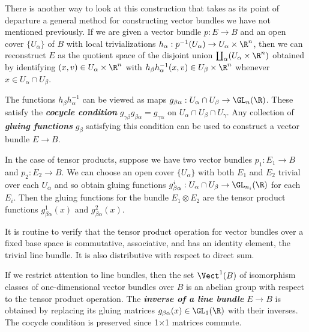 \begin{remark}
	There is another way to look at this construction that takes as its point of departure a general method for constructing vector bundles we have not mentioned previously. If we are given a vector bundle $p:E\to B$ and an open cover $\{U_\alpha\}$ of $B$ with local trivializations $h_\alpha:p^{-1}(U_\alpha)\to U_\alpha\times\R^n$, then we can reconstruct $E$ as the quotient space of the disjoint union $\coprod_\alpha(U_\alpha\times\R^n)$ obtained by identifying $(x,v)\in U_\alpha\times\R^n$ with $h_\beta h_\alpha^{-1}(x,v)\in U_\beta\times\R^n$ whenever $x\in U_\alpha\cap U_\beta$.
	
	The functions $h_\beta h_\alpha^{-1}$ can be viewed as maps $g_{\beta\alpha}:U_\alpha\cap U_\beta\to \GL_n(\R)$. These satisfy the \textbf{\textit{cocycle condition}}\label{cocycle-condition} $g_{\gamma\beta}g_{\beta\alpha}=g_{\gamma\alpha}$ on $U_\alpha\cap U_\beta\cap U_\gamma$. Any collection of \textbf{\textit{gluing functions}} $g_{\beta}$ satisfying this condition can be used to construct a vector bundle $E\to B$.
	
	In the case of tensor products, suppose we have two vector bundles $p_1:E_1\to B$ and $p_2:E_2\to B$. We can choose an open cover $\{U_\alpha\}$ with both $E_1$ and $E_2$ trivial over each $U_\alpha$ and so obtain gluing functions $g_{\beta\alpha}^i:U_\alpha\cap U_\beta\to\GL_{n_i}(\R)$ for each $E_i$. Then the gluing functions for the bundle $E_1\otimes E_2$ are the tensor product functions $g_{\beta\alpha}^1(x)$ and $g_{\beta\alpha}^2(x)$.
\end{remark}
\begin{prop}
	It is routine to verify that the tensor product operation for vector bundles over a fixed base space is commutative, associative, and has an identity element, the trivial line bundle. It is also distributive with respect to direct sum.
\end{prop}
\begin{defn}
	If we restrict attention to line bundles, then the set $\Vect^1(B)$ of isomorphism classes of one-dimensional vector bundles over $B$ is an abelian group with respect to the tensor product operation. The \textbf{\textit{inverse of a line bundle}} $E\to B$ is obtained by replacing its gluing matrices $g_{\beta\alpha}(x)\in\GL_1(\R)$ with their inverses. The cocycle condition is preserved since 1×1 matrices commute.
\end{defn}

